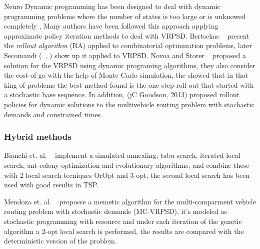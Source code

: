 Neuro Dynamic programming has been designed to deal with dynamic programming problems where the number of states is too large or is unknowed completely \cite{Bertsekas_1996}, Many authors have been followed this approach applying approximate policy iteration methods to deal with VRPSD. 
Bertsekas ~\cite{Bertsekas1997} present the \textit{rollout algorithm} (RA) applied to combinatorial optimization problems, later Secomandi (~\cite{Secomandi_1998}, \cite{secomandi_rollout_2001}) show up it applied to VRPSD. Novoa and Storer ~\cite{novoa_approximate_2009} proposed a solution for the VRPSD using dynamic programing algorithms, they also consider the cost-of-go with the help of Monte Carlo simulation, the showed that in that king of problems the best method found is the one-step roll-out that started with a stochastic base sequence. In addition, (jC Goodson, 2013) proposed rollout policies for dynamic solutions to the multivehicle routing problem with stochastic demands and constrained times.











\subsubsection{Hybrid methods}

Bianchi et. al. ~\cite{bianchi_hybrid_2006} implement a simulated annealing, tabu search, iterated local search, ant colony optimization and evolutionary algorithms, and combine these with 2 local search tecniques OrOpt and 3-opt, the second local search has been used with good results in TSP.

Mendoza et. al. ~\cite{mendoza_memetic_2010} proposse a memetic algorithm for the multi-comparment vehicle routing problem with stochastic demands (MC-VRPSD), it's modeled as stochastic programming with resource and under each iteration of the genetic algorithm a 2-opt local search is performed, the results are compared with the deterministic version of the problem.

